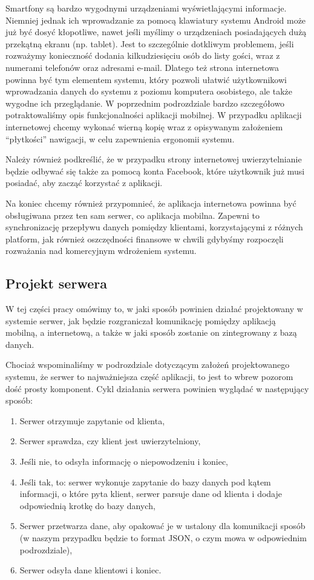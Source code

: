 \documentclass[12pt,titlepage]{article}
\begin{document}
Smartfony są bardzo wygodnymi urządzeniami wyświetlającymi informacje. Niemniej jednak ich wprowadzanie za pomocą klawiatury systemu Android może już być dosyć kłopotliwe, 
nawet jeśli myślimy o urządzeniach posiadających dużą przekątną ekranu (np. tablet). Jest to szczególnie dotkliwym problemem, jeśli rozważymy konieczność dodania kilkudziesięciu 
osób do listy gości, wraz z numerami telefonów oraz adresami e-mail.
Dlatego też strona internetowa powinna być tym elementem systemu, który pozwoli ułatwić użytkownikowi wprowadzania danych do systemu z poziomu komputera osobistego, ale także wygodne
ich przeglądanie. W poprzednim podrozdziale bardzo szczegółowo potraktowaliśmy opis funkcjonalności aplikacji mobilnej. W przypadku aplikacji internetowej chcemy wykonać wierną kopię 
wraz z opisywanym założeniem ``płytkości'' nawigacji, w celu zapewnienia ergonomii systemu.

Należy również podkreślić, że w przypadku strony internetowej uwierzytelnianie będzie odbywać się także za pomocą konta Facebook, które użytkownik już musi posiadać, aby zacząć korzystać
z aplikacji.

Na koniec chcemy również przypomnieć, że aplikacja internetowa powinna być obsługiwana przez ten sam serwer, co aplikacja mobilna. Zapewni to synchronizację przepływu danych pomiędzy klientami,
korzystającymi z różnych platform, jak również oszczędności finansowe w chwili gdybyśmy rozpoczęli rozważania nad komercyjnym wdrożeniem systemu.

\subsection{Projekt serwera}
W tej części pracy omówimy to, w jaki sposób powinien działać projektowany w systemie serwer, jak będzie rozgraniczał komunikację pomiędzy aplikacją mobilną, a internetową, a także w jaki sposób
zostanie on zintegrowany z bazą danych.

Chociaż wspominaliśmy w podrozdziale dotyczącym założeń projektowanego systemu, że serwer to najważniejsza część aplikacji, to jest to wbrew pozorom dość prosty komponent.
Cykl działania serwera powinien wyglądać w następujący sposób:

\begin{enumerate}
 \item Serwer otrzymuje zapytanie od klienta,
 \item Serwer sprawdza, czy klient jest uwierzytelniony,
 \item Jeśli nie, to odsyła informację o niepowodzeniu i koniec,
 \item Jeśli tak, to:
  serwer wykonuje zapytanie do bazy danych pod kątem informacji, o które pyta klient,
  serwer parsuje dane od klienta i dodaje odpowiednią krotkę do bazy danych,
 \item Serwer przetwarza dane, aby opakować je w ustalony dla komunikacji sposób (w naszym przypadku będzie to format JSON, o czym mowa w odpowiednim podrozdziale),
 \item Serwer odsyła dane klientowi i koniec.
\end{enumerate}
\end{document}
